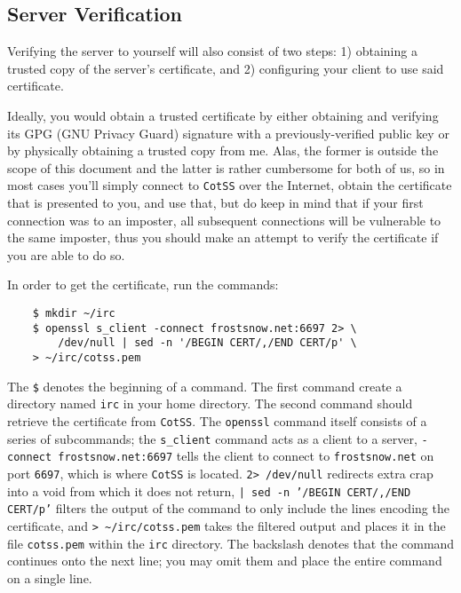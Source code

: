 \documentclass{article}
\begin{document}
\subsection{Server Verification}
Verifying the server to yourself will also consist of two steps: 1) obtaining a trusted copy of the server's certificate, and 2) configuring your client to use said certificate.

Ideally, you would obtain a trusted certificate by either obtaining and verifying its GPG (GNU Privacy Guard) signature with a previously-verified public key or by physically obtaining a trusted copy from me.  Alas, the former is outside the scope of this document and the latter is rather cumbersome for both of us, so in most cases you'll simply connect to \texttt{CotSS} over the Internet, obtain the certificate that is presented to you, and use that, but do keep in mind that if your first connection was to an imposter, all subsequent connections will be vulnerable to the same imposter, thus you should make an attempt to verify the certificate if you are able to do so.

In order to get the certificate, run the commands:
\begin{lstlisting}
    $ mkdir ~/irc
    $ openssl s_client -connect frostsnow.net:6697 2> \
        /dev/null | sed -n '/BEGIN CERT/,/END CERT/p' \
	> ~/irc/cotss.pem
\end{lstlisting}
The \texttt{\$} denotes the beginning of a command.  The first command create a directory named \texttt{irc} in your home directory.  The second command should retrieve the certificate from \texttt{CotSS}.  The \texttt{openssl} command itself consists of a series of subcommands; the \texttt{s\_client} command acts as a client to a server, \texttt{-connect frostsnow.net:6697} tells the client to connect to \texttt{frostsnow.net} on port \texttt{6697}, which is where \texttt{CotSS} is located.  \texttt{2> /dev/null} redirects extra crap into a void from which it does not return, \texttt{| sed -n '/BEGIN CERT/,/END CERT/p'} filters the output of the command to only include the lines encoding the certificate, and \texttt{> \textasciitilde/irc/cotss.pem} takes the filtered output and places it in the file \texttt{cotss.pem} within the \texttt{irc} directory.  The backslash denotes that the command continues onto the next line; you may omit them and place the entire command on a single line.
\end{document}
